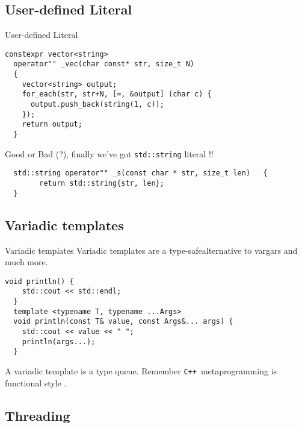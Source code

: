\documentclass[svgnames,smaller]{beamer}
\newcommand*{\cpp}{\texttt{C++}}
\begin{document}
\subsection{User-defined Literal}

\begin{frame}[fragile]{User-defined Literal}
  \begin{lstlisting}[title={\texttt{""\_vec}}]
  constexpr vector<string>
  operator"" _vec(char const* str, size_t N)
  {
    vector<string> output;
    for_each(str, str+N, [=, &output] (char c) {
      output.push_back(string(1, c));
    });
    return output;
  }
  \end{lstlisting}

  \begin{block}{Good or Bad (?), finally we've got \texttt{std::string} literal !!}
    \begin{lstlisting}
  std::string operator"" _s(const char * str, size_t len)	{
	    return std::string{str, len};
  }
    \end{lstlisting}
  \end{block}
\end{frame}


\subsection{Variadic templates}

\begin{frame}[fragile]{Variadic templates}
  Variadic templates are a type-safe\footnotemark[1] alternative to vargars and
  much more. %

  \begin{lstlisting}[title={println}]
  void println() {
    std::cout << std::endl;
  }
  template <typename T, typename ...Args>
  void println(const T& value, const Args&... args) {
    std::cout << value << " ";
    println(args...);
  }
  \end{lstlisting}

  A variadic template is a type queue.
  Remember \cpp\ metaprogramming is functional style \footnotemark[2].
\end{frame}

\subsection{Threading}
\end{document}
